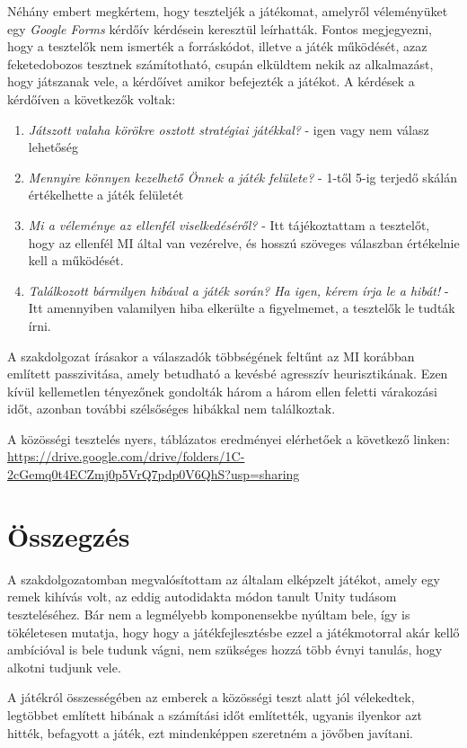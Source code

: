\documentclass[
]{thesis-ekf}
\theoremstyle{definition}
\theoremstyle{remark}
\begin{document}
Néhány embert megkértem, hogy teszteljék a játékomat, amelyről véleményüket egy \emph{Google Forms} kérdőív kérdésein keresztül leírhatták. Fontos megjegyezni, hogy a tesztelők nem ismerték a forráskódot, illetve a játék működését, azaz feketedobozos tesztnek számítotható, csupán elküldtem nekik az alkalmazást, hogy játszanak vele, a kérdőívet amikor befejezték a játékot. A kérdések a kérdőíven a következők voltak:
\begin{enumerate}
	\item \emph{Játszott valaha körökre osztott stratégiai játékkal?} - igen vagy nem válasz lehetőség
	\item \emph{Mennyire könnyen kezelhető Önnek a játék felülete?} - 1-től 5-ig terjedő skálán értékelhette a játék felületét
	\item \emph{Mi a véleménye az ellenfél viselkedéséről?} - Itt tájékoztattam a tesztelőt, hogy az ellenfél MI által van vezérelve, és hosszú szöveges válaszban értékelnie kell a működését.
	\item \emph{Találkozott bármilyen hibával a játék során? Ha igen, kérem írja le a hibát!} - Itt amennyiben valamilyen hiba elkerülte a figyelmemet, a tesztelők le tudták írni.
\end{enumerate}

A szakdolgozat írásakor a válaszadók többségének feltűnt az MI korábban említett passzivitása, amely betudható a kevésbé agresszív heurisztikának. Ezen kívül kellemetlen tényezőnek gondolták három a három ellen feletti várakozási időt, azonban további szélsőséges hibákkal nem találkoztak.

A közösségi tesztelés nyers, táblázatos eredményei elérhetőek a következő linken: \url{https://drive.google.com/drive/folders/1C-2cGemq0t4ECZmj0p5VrQ7pdp0V6QhS?usp=sharing}

\chapter*{Összegzés}

A szakdolgozatomban megvalósítottam az általam elképzelt játékot, amely egy remek kihívás volt, az eddig autodidakta módon tanult Unity tudásom teszteléséhez. Bár nem a legmélyebb komponensekbe nyúltam bele, így is tökéletesen mutatja, hogy hogy a játékfejlesztésbe ezzel a játékmotorral akár kellő ambícióval is bele tudunk vágni, nem szükséges hozzá több évnyi tanulás, hogy alkotni tudjunk vele.

A játékról összességében az emberek a közösségi teszt alatt jól vélekedtek, legtöbbet említett hibának a számítási időt említették, ugyanis ilyenkor azt hitték, befagyott a játék, ezt mindenképpen szeretném a jövőben javítani.
\end{document}
